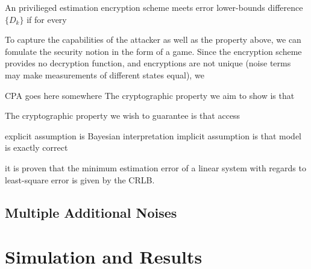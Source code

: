 \documentclass[conference]{IEEEtran}
\theoremstyle{definition}
\theoremstyle{definition}
\theoremstyle{remark}
\begin{document}
An privilieged estimation encryption scheme meets error lower-bounds difference $\{D_k\}$ if for every 

To capture the capabilities of the attacker as well as the property above, we can fomulate the security notion in the form of a game. Since the encryption scheme provides no decryption function, and encryptions are not unique (noise terms may make measurements of different states equal), we

CPA goes here somewhere
The cryptographic property we aim to show is that 

The cryptographic property we wish to guarantee is that access


explicit assumption is Bayesian interpretation
implicit assumption is that model is exactly correct


it is proven that the minimum estimation error of a linear system with regards to least-square error is given by the CRLB.

\subsection{Multiple Additional Noises}


\section{Simulation and Results}


%
%
\end{document}
